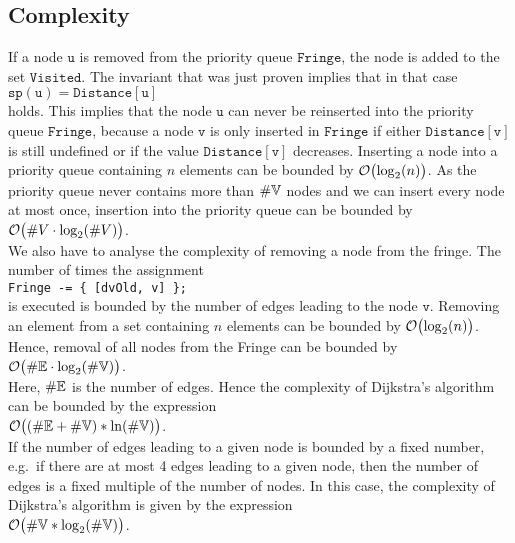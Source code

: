 \subsection{Complexity}
If a node $\mathtt{u}$ is removed from the priority queue $\mathtt{Fringe}$, the node is added to the set
$\mathtt{Visited}$.  The invariant that was just proven implies that in that case
\\[0.2cm]
\hspace*{1.3cm}
$\mathtt{sp(u)} = \mathtt{Distance[u]}$
\\[0.2cm]
holds.  This implies that the node $\mathtt{u}$ can never be reinserted into the priority queue
$\mathtt{Fringe}$, because a node $\mathtt{v}$ is only inserted in $\mathtt{Fringe}$ if either 
 $\mathtt{Distance}[\mathtt{v}]$ is still undefined or if  the  value $\mathtt{Distance}[\mathtt{v}]$ decreases.  
Inserting a node into a priority queue containing  $n$ elements can be bounded by
$\mathcal{O}\bigl(\log_2(n)\bigr)$.  As the priority queue never contains more than $\#{\mathbb V}$ nodes and we
can insert every node at most once, insertion into the priority queue can be bounded by
\\[0.2cm]
\hspace*{1.3cm}
$\mathcal{O}\bigl(\#V \cdot \log_2(\#V)\bigr)$.
\\[0.2cm]
We also have to analyse the complexity of removing a node from the fringe. 
The number of times the assignment
\\[0.2cm]
\hspace*{1.3cm}
\texttt{Fringe -= \{ [dvOld, v] \};} 
\\[0.2cm]
is executed is bounded by the number of edges leading to the node $\mathtt{v}$.
Removing an element from a set containing $n$ elements can be bounded by
 $\mathcal{O}\bigl(\log_2(n)\bigr)$.  Hence, removal of all nodes from the Fringe can be bounded by
\\[0.2cm]
\hspace*{1.3cm}
$\mathcal{O}\bigl(\#{\mathbb E} \cdot \log_2(\#{\mathbb V})\bigr)$.
\\[0.2cm]
Here,  $\#{\mathbb E}$ is the number of edges.  Hence the complexity of Dijkstra's algorithm can be
bounded by the expression \\[0.2cm]
\hspace*{1.3cm} $\mathcal{O}\bigl((\#{\mathbb E} + \#{\mathbb V}) * \ln(\#{\mathbb V})\bigr)$. \\[0.2cm]
If the number of edges leading  to a given node is bounded by a fixed number, e.g.~if there
are at most 4 edges leading to a given node, then the number of edges is a fixed multiple of the
number of nodes.  In this case, the complexity of 
 Dijkstra's algorithm is given by the expression  
\\[0.2cm]
\hspace*{1.3cm}
$\mathcal{O}\bigl(\#{\mathbb V} * \log_2(\#{\mathbb V})\bigr)$.





